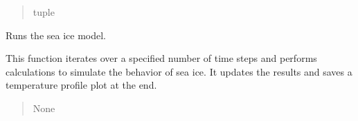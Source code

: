 \documentclass[a4paper,11pt,english,openany]{sphinxmanual}
\begin{document}
\begin{fulllineitems}
\begin{fulllineitems}
\begin{quote}
\begin{description}
\sphinxAtStartPar
tuple

\end{description}\end{quote}

\end{fulllineitems}


\begin{fulllineitems}
\label{\detokenize{api/spyice.models.sea_ice_model:src.spyice.models.sea_ice_model.SeaIceModel.run_sea_ice_model}}
\pysigstartsignatures
\pysiglinewithargsret
{}
{}
{}
\pysigstopsignatures
\sphinxAtStartPar
Runs the sea ice model.

\sphinxAtStartPar
This function iterates over a specified number of time steps and performs calculations
to simulate the behavior of sea ice. It updates the results and saves a temperature profile
plot at the end.
\begin{quote}\begin{description}
\sphinxAtStartPar
{}

\sphinxAtStartPar
None

\end{description}\end{quote}

\end{fulllineitems}



\end{fulllineitems}
\end{document}
